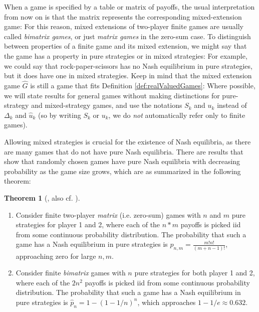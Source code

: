 \documentclass[a4paper]{scrreprt}
\theoremstyle{definition}
\newtheorem{thm}{Theorem}[chapter] %
\begin{document}
    When a game is specified by a table or matrix of payoffs, the usual interpretation from now on is that the matrix represents the corresponding mixed-extension game:
    For this reason, mixed extensions of two-player finite
    games are usually called \emph{bimatrix games}, or just \emph{matrix games} in the zero-sum case.
    To distinguish between properties of a finite game and its mixed extension, we might say that the game has a property in pure strategies or in mixed strategies:
    For example, we could say that rock-paper-scissors has no Nash equilibrium in pure strategies, but it does have one in mixed strategies.
    Keep in mind that the mixed extension game $\hat{G}$ is still a game that fits Definition \ref{def:realValuedGames}:
    Where possible, we will state results for general games without making distinctions for pure-strategy and mixed-strategy games, and use the notations $S_k$ and $u_k$ instead of $\Delta_k$ and $\hat{u}_k$ (so by writing $S_k$ or $u_k$, we do \emph{not} automatically refer only to finite games).
    
    Allowing mixed strategies is crucial for the existence of Nash equilibria, as there are many games that do not have pure Nash equilibria. There are results that show that randomly chosen games have pure Nash equilibria with decreasing probability as the game size grows, which are as summarized in the following theorem:
    \begin{thm}[{\cite{bib:goldbergProbabilityOfEquilibria}, also cf. \cites[p.15]{bib:matsumotoGameTheory}[Exercise 1.2]{bib:nisanAlgorithmicGameTheoryCh1Basic}}]~
        \label{thm:probabilityOfPureNashEquilibria}
        \begin{enumerate}
            \item
            Consider finite two-player \emph{matrix} (i.e. zero-sum) games with $n$ and $m$ pure strategies for player 1 and 2, where each of the $n*m$ payoffs is picked iid from some continuous probability distribution.
            The probability that such a game has a Nash equilibrium in pure strategies is $p_{n, m} = \frac{m! n!}{(m+n-1)!}$, approaching zero for large $n, m$.
            
            \item 
            Consider finite \emph{bimatrix} games with $n$ pure strategies for both player 1 and 2, where each of the $2n^2$ payoffs is picked iid from some continuous probability distribution.
            The probability that such a game has a Nash equilibrium in pure strategies is $\hat{p}_{n} = 1 - (1-1/n)^n$, which approaches $1 - 1/e \approx 0.632$.
        \end{enumerate}
    \end{thm}
\end{document}
